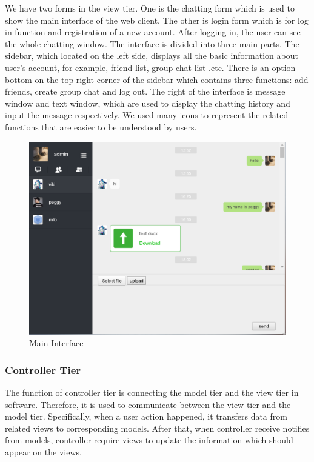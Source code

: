 \documentclass[a4paper,11pt]{article}
\begin{document}
We have two forms in the view tier. One is the chatting form which is used to show the main interface of the web client. The other is login form which is for log in function and registration of a new account. After logging in, the user can see the whole chatting window. The interface is divided into three main parts. The sidebar, which located on the left side, displays all the basic information about user’s account, for example, friend list, group chat list .etc. There is an option bottom on the top right corner of the sidebar which contains three functions: add friends, create group chat and log out. The right of the interface is message window and text window, which are used to display the chatting history and input the message respectively. We used many icons to represent the related functions that are easier to be understood by users. 

\begin{figure}[h!]
\centering
\includegraphics[width = 0.9 \textwidth ]{maininterface.png}
\caption{\label{fig:UML}Main Interface}
\end{figure}

\subsubsection*{Controller Tier}
The function of controller tier is connecting the model tier and the view tier in software. Therefore, it is used to communicate between the view tier and the model tier. Specifically, when a user action happened, it transfers data from related views to corresponding models. After that, when controller receive notifies from models, controller require views to update the information which should appear on the views. 
\end{document}
